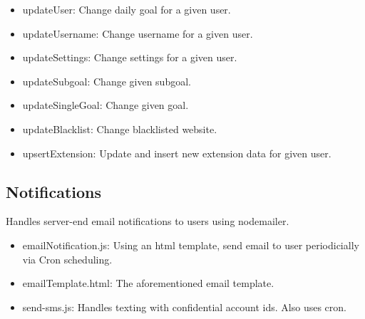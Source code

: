 \documentclass[letterpaper, 10 pt]{report}
\begin{document}
\begin{itemize}
 \item updateUser: Change daily goal for a given user.
 \item updateUsername: Change username for a given user.
 \item updateSettings: Change settings for a given user.
 \item updateSubgoal: Change given subgoal.
 \item updateSingleGoal: Change given goal.
 \item updateBlacklist: Change blacklisted website.
 \item upsertExtension: Update and insert new extension data for given user.
 
\end{itemize}

\subsection{Notifications}
Handles server-end email notifications to users using nodemailer.
\begin{itemize}
\item emailNotification.js: Using an html template, send email to user periodicially via Cron scheduling.
\item emailTemplate.html: The aforementioned email template.
\item send-sms.js: Handles texting with confidential account ids. Also uses cron.
\end{itemize}
\newpage
%

\end{document}
